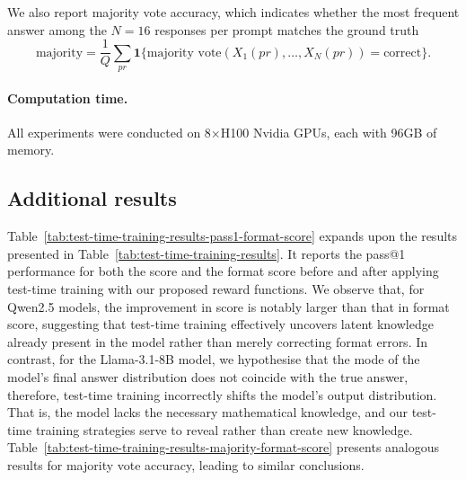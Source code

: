 We also report majority vote accuracy, which indicates whether the most frequent answer among the $N = 16$ responses per prompt matches the ground truth
$$
\text{majority}= \frac{1}{Q}\sum_{pr} \mathbf{1}\{\text{majority vote}(X_1(pr), \dots, X_N(pr))=\text{correct}\}.
$$

\paragraph{Computation time.}
All experiments were conducted on 8$\times$H100 Nvidia GPUs, each with 96GB of memory.


\subsection{Additional results}\label{app:subsec_additional_results}
Table~\ref{tab:test-time-training-results-pass1-format-score} expands upon the results presented in Table~\ref{tab:test-time-training-results}. 
It reports the pass@1 performance for both the score and the format score before and after applying test-time training with our proposed reward functions. 
We observe that, for Qwen2.5 models, the improvement in score is notably larger than that in format score, suggesting that test-time training effectively uncovers latent knowledge already present in the model rather than merely correcting format errors.
In contrast, for the Llama-3.1-8B model, we hypothesise that the mode of the model's final answer distribution does not coincide with the true answer, therefore, test-time training incorrectly shifts the model's output distribution. That is, the model lacks the necessary mathematical knowledge, and our test-time training strategies serve to reveal rather than create new knowledge.
Table~\ref{tab:test-time-training-results-majority-format-score} presents analogous results for majority vote accuracy, leading to similar conclusions.

